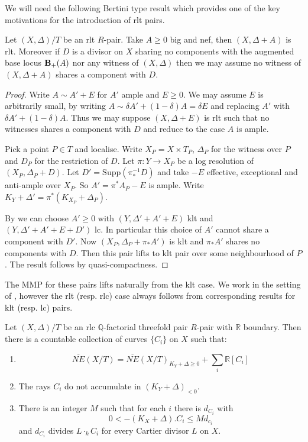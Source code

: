 	We will need the following Bertini type result which provides one of the key motivations for the introduction of rlt pairs.
	
	\begin{lemma}\label{bertini}
		Let $(X,\Delta)/T$ be an rlt $R$-pair. Take $A\geq 0$ big and nef, then $(X,\Delta+A)$ is rlt. Moreover if $D$ is a divisor on $X$ sharing no components with the augmented base locus $\mathbf{B}_{+}(A)$ nor any witness of $(X,\Delta)$ then we may assume no witness of $(X,\Delta+A)$ shares a component with $D$.
	\end{lemma}
	\begin{proof}
		Write $A \sim A'+E$ for $A'$ ample and $E \geq 0$. We may assume $E$ is arbitrarily small, by writing $A\sim \delta A' + (1-\delta)A=\delta E$ and replacing $A'$ with $\delta A' + (1-\delta)A$. Thus we may suppose $(X,\Delta+E)$ is rlt such that no witnesses shares a component with $D$ and reduce to the case $A$ is ample.
		
		Pick a point $P \in T$ and localise. Write $X_{P}=X \times T_{P}$, $\Delta_{P}$ for the witness over $P$ and $D_{P}$ for the restriction of $D$. Let $\pi:Y \to X_{P}$ be a log resolution of $(X_{P},\Delta_{P}+D)$. Let $D'=\text{Supp}(\pi^{-1}_{*}D)$ and take $-E$ effective, exceptional and anti-ample over $X_{P}$. So $A'=\pi^{*}A_{P}-E$ is ample. Write $K_{Y}+\Delta'=\pi^{*}(K_{X_{P}}+\Delta_{P})$.
		
		By \cite[Theorem 2.11]{bhatt2020} we can choose $A'\geq 0$ with $(Y,\Delta'+A'+E)$ klt and $(Y,\Delta'+A'+E+D')$ lc. In particular this choice of $A'$ cannot share a component with $D'$. Now $(X_{P},\Delta_{P}+\pi_{*}A')$ is klt and $\pi_{*}A'$ shares no components with $D$. Then this pair lifts to klt pair over some neighbourhood of $P$. The result follows by quasi-compactness.
	\end{proof}

	The MMP for these pairs lifts naturally from the klt case. We work in the setting of \cite{bhatt2020}, however the rlt (resp. rlc) case always follows from corresponding results for klt (resp. lc) pairs.
	
	
	\begin{theorem}
		Let $(X,\Delta)/T$ be an rlc $\mathbb{Q}$-factorial threefold pair $R$-pair with $\mathbb{R}$ boundary.	Then there is a countable collection of curves $\{C_{i}\}$ on $X$ such that:
		\begin{enumerate}
			\item $$\overline{NE}(X/T)=\overline{NE}(X/T)_{K_{Y}+\Delta \geq 0} + \sum_{i} \mathbb{R}[C_{i}]$$
			\item The rays $C_{i}$ do not accumulate in $(K_{Y}+\Delta)_{<0}$.
			\item There is an integer $M$ such that for each $i$ there is $d_{C_{i}}$ with 
			\[0 < -(K_{X}+\Delta).C_{i} \leq Md_{c_{i}}\]
			and $d_{C_{i}}$ divides $L\cdot_{k}C_{i}$ for every Cartier divisor $L$ on $X$.
		\end{enumerate}
	\end{theorem}
	
